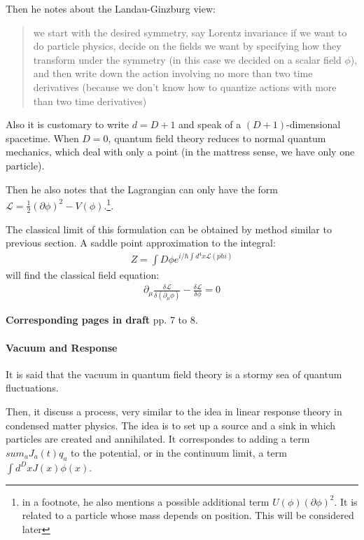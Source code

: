 \documentclass{book}
\numberwithin{equation}{subsection} %
\theoremstyle{definition}
\begin{document}
Then he notes about the Landau-Ginzburg view:

\begin{quote}
    we start with the desired symmetry, say Lorentz invariance if we
    want to do particle physics, decide on the fields we want by 
    specifying how they transform
    under the symmetry (in this case we decided on a scalar field 
    $\phi$), and then write down
    the action involving no more than two time derivatives 
    (because we don’t know how to
    quantize actions with more than two time derivatives)
\end{quote}

Also it is customary to write $d = D + 1$ and speak of a 
$(D + 1)$-dimensional spacetime. When $D=0$, quantum
field theory reduces to normal quantum mechanics,
which deal with only a point (in the mattress
sense, we have only one particle).

Then he also notes that the Lagrangian can only have the form
$\mathcal{L}=\frac{1}{2}(\partial\phi)^2-V(\phi)$.\footnote{
    in a footnote, he also mentions a possible additional
    term $U(\phi)(\partial \phi)^2$. It is related to a
    particle whose mass depends on position. This will be
considered later}.

The classical limit of this formulation can be obtained by
method similar to previous section. A saddle point approximation
to the integral:
\begin{align}
    Z = \int D\phi e^{i/\hbar \int d^4x \mathcal{L}(phi)}
\end{align}
will find the classical field equation:
\begin{align}
    \label{eq:QFT_in_a_Nutshell_Part_I.3.classicalFieldEq}
    \partial_\mu \frac{\delta \mathcal{L}}{\delta(\partial_\mu\phi)}
    -\frac{\delta\mathcal{L}}{\delta\phi} =0
\end{align}

\textbf{Corresponding pages in draft} pp. 7 to 8.

\paragraph{Vacuum and Response}

It is said that the vacuum in quantum field theory is a
stormy sea of quantum fluctuations.

Then, it discuss a process, very similar to the idea in linear
response theory in condensed matter physics. The idea is to
set up a source and a sink in which particles are created and
annihilated. It correspondes to adding a term $sum_a J_a(t)q_a$ to
the potential, or in the continuum limit, a term $\int d^DxJ(x)\phi(x)$.
\end{document}
